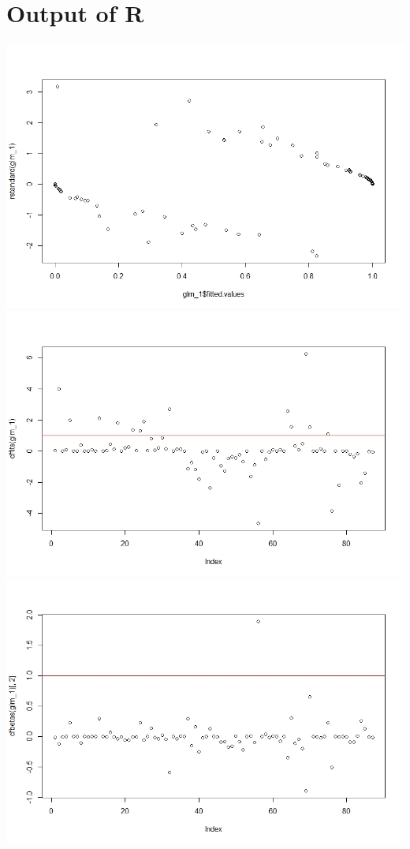 \documentclass[12pt,a4paper]{article}
\begin{document}
\section{Output of R}
\begin{center}
\includegraphics[scale = 0.6]{rstandard.jpeg}
\includegraphics[scale = 0.6]{DFFITS.jpeg}
\includegraphics[scale = 0.6]{DFBETAS.jpeg}
\end{center}
\end{document}
